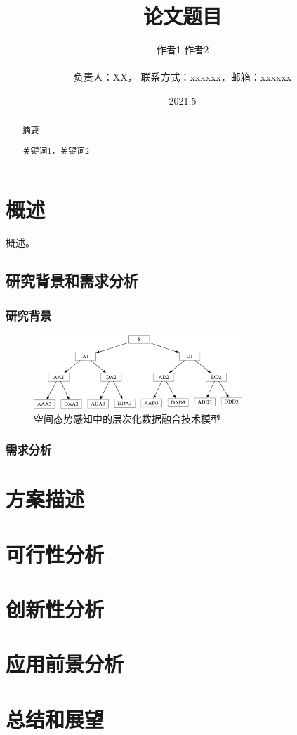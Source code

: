 \documentclass{sky}
\title{论文题目}
\author{作者1 \quad 作者2 \vspace{10pt}\\ \zihao{-5}{（单位）\vspace{10pt}}\\ {\kaishu \zihao{5}负责人：XX， 联系方式：xxxxxx，邮箱：xxxxxx}}
\date{2021.5}
\begin{document}
    \begin{titlepage}
        \maketitle

    \end{titlepage}
    

    \begin{abstract}
        \onehalfspacing
    {}摘要

    {}关键词1，关键词2
    \end{abstract}
    
    \newpage
    \tableofcontents
    \newpage
    \section{概述}
    概述\cite{artwritingscientific-Geer-2000}。
    \subsection{研究背景和需求分析}
    \subsubsection{研究背景}
    \begin{figure}[htbp]
        \centering
        \includegraphics[width=0.7\textwidth,scale=1.0]{pictures/waveletpacket.png}
        \caption{空间态势感知中的层次化数据融合技术模型}
        \label{networkdiagram}
    \end{figure}
    \subsubsection{需求分析}
    \section{方案描述}
    \section{可行性分析}
    \section{创新性分析}
    \section{应用前景分析}
    \section{总结和展望}

    \begin{myfigureandtable}
        \listoffigures

        \listoftables
    \end{myfigureandtable}

    \begin{myreference}
        
        
    \end{myreference}
    
\end{document}
